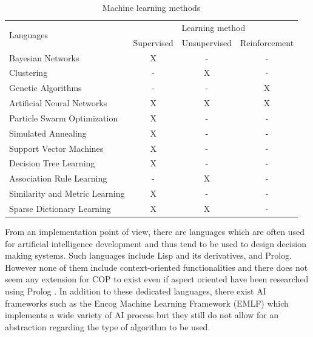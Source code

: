 \documentclass[a4paper]{article}
\begin{document}
\begin{table}[bt]
\begin{tabular}{l c c c }
\hline
\multirow{2}{*}{Languages} & \multicolumn{3}{c}{Learning method} \\

 & Supervised	 & Unsupervised	& Reinforcement \\

\hline
Bayesian Networks	             & X & - & - \\

\hline
Clustering	                     & - & X & - \\

\hline
Genetic Algorithms             & - & - & X \\

\hline
Artificial Neural Networks     & X & X & X \\

\hline
Particle Swarm Optimization    & X & - &	- \\

\hline
Simulated Annealing            & X & - &	- \\

\hline
Support Vector Machines        & X & - & - \\

\hline
Decision Tree Learning         & X & - &	- \\

\hline
Association Rule Learning      & - &	X &	- \\

\hline
Similarity and Metric Learning & X &	- &	- \\

\hline
Sparse Dictionary Learning     & X & X &	- \\
\end{tabular}

  \caption{Machine learning methods}
  \label{table:machinelearning}
\end{table} 

From an implementation point of view, there are languages which are often used for artificial intelligence development and thus tend to be used to design decision making systems. Such languages include Lisp and its derivatives, and Prolog. However none of them include context-oriented functionalities and there does not seem any extension for COP to exist even if aspect oriented have been researched using Prolog \cite{lohmann_aspect-oriented_2008}. In addition to these dedicated languages, there exist AI frameworks such as the Encog Machine Learning Framework (EMLF) which implements a wide variety of AI process but they still do not allow for an abstraction regarding the type of algorithm to be used.
\end{document}
